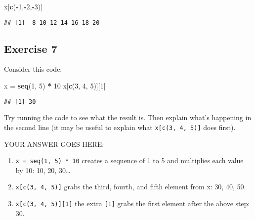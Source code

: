 \documentclass[
]{article}
\newenvironment{Shaded}{\begin{snugshade}}{\end{snugshade}}
\newcommand{\DecValTok}[1]{\textcolor[rgb]{0.00,0.00,0.81}{#1}}
\newcommand{\KeywordTok}[1]{\textcolor[rgb]{0.13,0.29,0.53}{\textbf{#1}}}
\newcommand{\NormalTok}[1]{#1}
\newcommand{\OperatorTok}[1]{\textcolor[rgb]{0.81,0.36,0.00}{\textbf{#1}}}
\newcommand{\StringTok}[1]{\textcolor[rgb]{0.31,0.60,0.02}{#1}}
\providecommand{\tightlist}{%
  \setlength{\itemsep}{0pt}\setlength{\parskip}{0pt}}
\begin{document}
\begin{Shaded}
\begin{Highlighting}[]
\NormalTok{x[}\KeywordTok{c}\NormalTok{(}\OperatorTok{{-}}\DecValTok{1}\NormalTok{,}\OperatorTok{{-}}\DecValTok{2}\NormalTok{,}\OperatorTok{{-}}\DecValTok{3}\NormalTok{)]}
\end{Highlighting}
\end{Shaded}

\begin{verbatim}
## [1]  8 10 12 14 16 18 20
\end{verbatim}

\hypertarget{exercise-7}{%
\subsection{Exercise 7}\label{exercise-7}}

Consider this code:

\begin{Shaded}
\begin{Highlighting}[]
\NormalTok{x =}\StringTok{ }\KeywordTok{seq}\NormalTok{(}\DecValTok{1}\NormalTok{, }\DecValTok{5}\NormalTok{) }\OperatorTok{*}\StringTok{ }\DecValTok{10}
\NormalTok{x[}\KeywordTok{c}\NormalTok{(}\DecValTok{3}\NormalTok{, }\DecValTok{4}\NormalTok{, }\DecValTok{5}\NormalTok{)][}\DecValTok{1}\NormalTok{]}
\end{Highlighting}
\end{Shaded}

\begin{verbatim}
## [1] 30
\end{verbatim}

Try running the code to see what the result is. Then explain what's
happening in the second line (it may be useful to explain what
\texttt{x{[}c(3,\ 4,\ 5){]}} does first).

YOUR ANSWER GOES HERE:

\begin{enumerate}
\def\labelenumi{\arabic{enumi}.}
\tightlist
\item
  \texttt{x\ =\ seq(1,\ 5)\ *\ 10} creates a sequence of 1 to 5 and
  multiplies each value by 10: 10, 20, 30\ldots{}
\item
  \texttt{x{[}c(3,\ 4,\ 5){]}} grabs the third, fourth, and fifth
  element from x: 30, 40, 50.
\item
  \texttt{x{[}c(3,\ 4,\ 5){]}{[}1{]}} the extra \texttt{{[}1{]}} grabs
  the first element after the above step: 30.
\end{enumerate}
\end{document}
